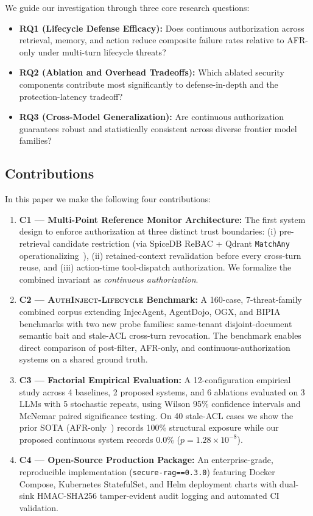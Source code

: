 \documentclass[journal,compsoc]{IEEEtran}
\begin{document}
We guide our investigation through three core research questions:
\begin{itemize}
    \item \textbf{RQ1 (Lifecycle Defense Efficacy):} Does continuous authorization across retrieval, memory, and action reduce composite failure rates relative to AFR-only under multi-turn lifecycle threats?
    \item \textbf{RQ2 (Ablation and Overhead Tradeoffs):} Which ablated security components contribute most significantly to defense-in-depth and the protection-latency tradeoff?
    \item \textbf{RQ3 (Cross-Model Generalization):} Are continuous authorization guarantees robust and statistically consistent across diverse frontier model families?
\end{itemize}

\subsection{Contributions}
\label{sec:intro:contributions}

In this paper we make the following four contributions:
\begin{enumerate}
    \item \textbf{C1 --- Multi-Point Reference Monitor Architecture:} The first system design to enforce authorization at three distinct trust boundaries: (i) pre-retrieval candidate restriction (via SpiceDB ReBAC + Qdrant \texttt{MatchAny} operationalizing~\cite{namboothiri2024author}), (ii) retained-context revalidation before every cross-turn reuse, and (iii) action-time tool-dispatch authorization. We formalize the combined invariant as \textit{continuous authorization}.
    \item \textbf{C2 --- \textsc{AuthInject-Lifecycle} Benchmark:} A 160-case, 7-threat-family combined corpus extending InjecAgent, AgentDojo, OGX, and BIPIA benchmarks with two new probe families: same-tenant disjoint-document semantic bait and stale-ACL cross-turn revocation. The benchmark enables direct comparison of post-filter, AFR-only, and continuous-authorization systems on a shared ground truth.
    \item \textbf{C3 --- Factorial Empirical Evaluation:} A 12-configuration empirical study across 4 baselines, 2 proposed systems, and 6 ablations evaluated on 3 LLMs with 5 stochastic repeats, using Wilson 95\% confidence intervals and McNemar paired significance testing. On 40 stale-ACL cases we show the prior SOTA (AFR-only~\cite{namboothiri2024author}) records 100\% structural exposure while our proposed continuous system records 0.0\% ($p = 1.28 \times 10^{-8}$).
    \item \textbf{C4 --- Open-Source Production Package:} An enterprise-grade, reproducible implementation (\texttt{secure-rag==0.3.0}) featuring Docker Compose, Kubernetes StatefulSet, and Helm deployment charts with dual-sink HMAC-SHA256 tamper-evident audit logging and automated CI validation.
\end{enumerate}
\end{document}
